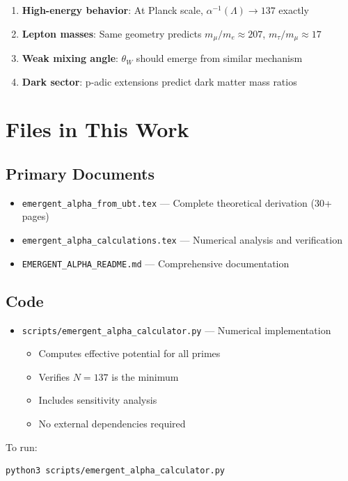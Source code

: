 \documentclass[12pt, a4paper]{article}
\begin{document}
\begin{enumerate}
\item \textbf{High-energy behavior}: At Planck scale, $\alpha^{-1}(\Lambda) \to 137$ exactly
\item \textbf{Lepton masses}: Same geometry predicts $m_\mu/m_e \approx 207$, $m_\tau/m_\mu \approx 17$
\item \textbf{Weak mixing angle}: $\theta_W$ should emerge from similar mechanism
\item \textbf{Dark sector}: p-adic extensions predict dark matter mass ratios
\end{enumerate}

\section{Files in This Work}

\subsection{Primary Documents}

\begin{itemize}
\item \texttt{emergent\_alpha\_from\_ubt.tex} — Complete theoretical derivation (30+ pages)
\item \texttt{emergent\_alpha\_calculations.tex} — Numerical analysis and verification
\item \texttt{EMERGENT\_ALPHA\_README.md} — Comprehensive documentation
\end{itemize}

\subsection{Code}

\begin{itemize}
\item \texttt{scripts/emergent\_alpha\_calculator.py} — Numerical implementation
  \begin{itemize}
  \item Computes effective potential for all primes
  \item Verifies $N = 137$ is the minimum
  \item Includes sensitivity analysis
  \item No external dependencies required
  \end{itemize}
\end{itemize}

To run:
\begin{verbatim}
python3 scripts/emergent_alpha_calculator.py
\end{verbatim}
\end{document}
